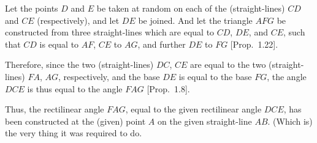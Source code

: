 \begin{Parallel}{}{}
{\epsfysize=2.2in
\centerline{}

Let the points $D$ and $E$ be taken at random on each
of the (straight-lines) $CD$ and $CE$ (respectively), and let $DE$ be joined.
And let the triangle $AFG$ be constructed from three straight-lines
which are equal to $CD$, $DE$, and $CE$, such that $CD$ is equal to $AF$,
$CE$ to $AG$, and further $DE$ to $FG$ [Prop.~1.22].

Therefore, since the two (straight-lines) $DC$, $CE$ are equal to the
two (straight-lines) $FA$, $AG$, respectively, and the base $DE$ is equal to
the base $FG$, the angle $DCE$ is thus equal to the angle $FAG$ [Prop.~1.8].

Thus, the rectilinear angle $FAG$,  equal to the  given
rectilinear angle $DCE$, has been constructed at the (given) point $A$ on the given straight-line $AB$.
(Which is) the very thing it was required to do.}
\end{Parallel}

